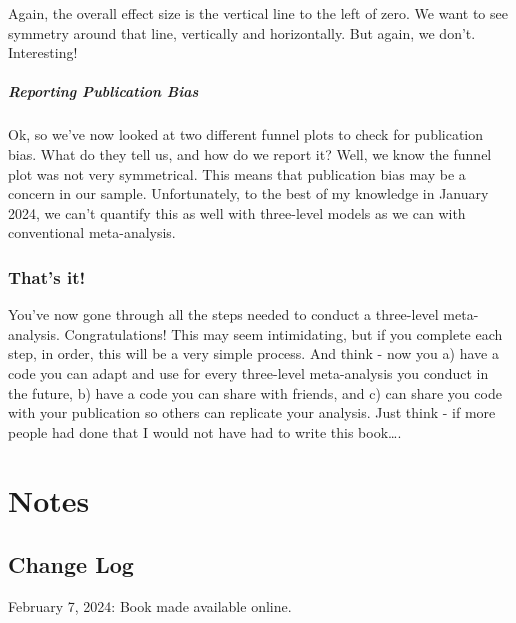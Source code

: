 \documentclass[
]{book}
\begin{document}
Again, the overall effect size is the vertical line to the left of zero. We want to see symmetry around that line, vertically and horizontally. But again, we don't. Interesting!

\hypertarget{reporting-publication-bias-1}{%
\subsubsection{Reporting Publication Bias}\label{reporting-publication-bias-1}}

Ok, so we've now looked at two different funnel plots to check for publication bias. What do they tell us, and how do we report it? Well, we know the funnel plot was not very symmetrical. This means that publication bias may be a concern in our sample. Unfortunately, to the best of my knowledge in January 2024, we can't quantify this as well with three-level models as we can with conventional meta-analysis.

\hypertarget{thats-it-1}{%
\section{That's it!}\label{thats-it-1}}

You've now gone through all the steps needed to conduct a three-level meta-analysis. Congratulations! This may seem intimidating, but if you complete each step, in order, this will be a very simple process. And think - now you a) have a code you can adapt and use for every three-level meta-analysis you conduct in the future, b) have a code you can share with friends, and c) can share you code with your publication so others can replicate your analysis. Just think - if more people had done that I would not have had to write this book\ldots.

\hypertarget{section-1}{%
\subsubsection{}\label{section-1}}

\hypertarget{part-notes}{%
\part{Notes}\label{part-notes}}

\hypertarget{change-log}{%
\chapter*{Change Log}\label{change-log}}

February 7, 2024: Book made available online.

  
\end{document}

